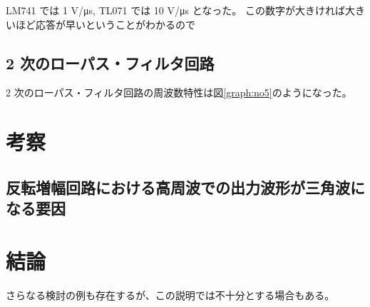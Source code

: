 \documentclass[11pt,dvipdfmx,a4paper]{jsarticle}
\begin{document}
LM741 では 1 V/\si{\micro s},
TL071 では 10 V/\si{\micro s} となった。
この数字が大きければ大きいほど応答が早いということがわかるので

\subsection{2 次のローパス・フィルタ回路}
2 次のローパス・フィルタ回路の周波数特性は図\ref{graph:no5}のようになった。


\section{考察}
\subsection{反転増幅回路における高周波での出力波形が三角波になる要因}

\section{結論}


さらなる検討の例\cite{huga}も存在するが、この説明では不十分とする場合もある\cite{hoge}。



\end{document}
